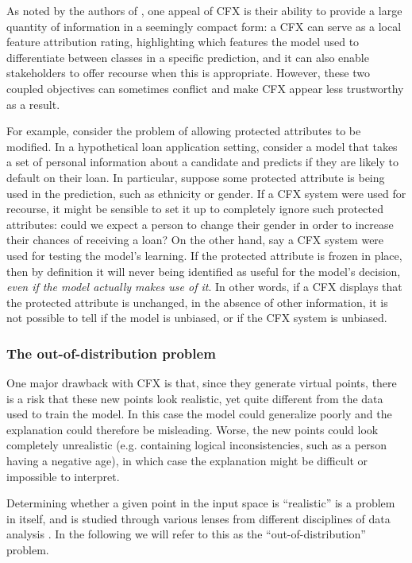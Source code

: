 \documentclass[../main.tex]{subfiles}
\begin{document}
As noted by the authors of \cite{wachterCounterfactual2017}, one appeal of CFX is their ability to provide a large quantity of information in a seemingly compact form: a CFX can serve as a local feature attribution rating, highlighting which features the model used to differentiate between classes in a specific prediction, and it can also enable stakeholders to offer recourse when this is appropriate.
However, these two coupled objectives can sometimes conflict and make CFX appear less trustworthy as a result.

For example, consider the problem of allowing protected attributes to be modified.
In a hypothetical loan application setting, consider a model that takes a set of personal information about a candidate and predicts if they are likely to default on their loan.
In particular, suppose some protected attribute is being used in the prediction, such as ethnicity or gender.
If a CFX system were used for recourse, it might be sensible to set it up to completely ignore such protected attributes: could we expect a person to change their gender in order to increase their chances of receiving a loan?
On the other hand, say a CFX system were used for testing the model's learning. If the protected attribute is frozen in place, then by definition it will never being identified as useful for the model's decision, \emph{even if the model actually makes use of it}.
In other words, if a CFX displays that the protected attribute is unchanged, in the absence of other information, it is not possible to tell if the model is unbiased, or if the CFX system is unbiased.

\subsubsection{The out-of-distribution problem}

One major drawback with CFX is that, since they generate virtual points, there is a risk that these new points look realistic, yet quite different from the data used to train the model.
In this case the model could generalize poorly and the explanation could therefore be misleading.
Worse, the new points could look completely unrealistic (e.g. containing logical inconsistencies, such as a person having a negative age), in which case the explanation might be difficult or impossible to interpret.

Determining whether a given point in the input space is ``realistic'' is a problem in itself, and is studied through various lenses from different disciplines of data analysis \cite{yangGeneralized2022}.
In the following we will refer to this as the ``out-of-distribution'' problem.
\end{document}
